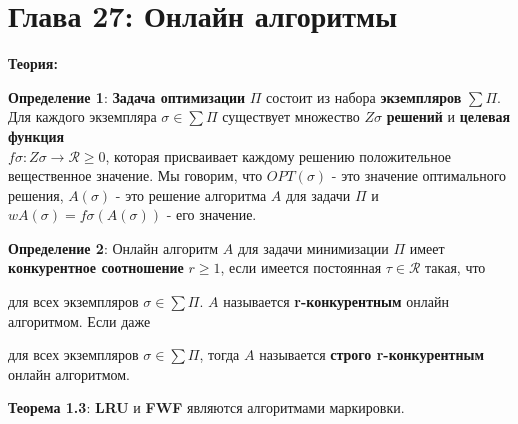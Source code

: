 
\chapter*{Глава 27: Онлайн алгоритмы}

\textbf{Теория:}

\vspace{\baselineskip}

\textbf{Определение 1}: \textbf{Задача оптимизации} $\Pi$ состоит из набора \textbf{экземпляров} $\sum \Pi$. Для каждого экземпляра $\sigma \in \sum\Pi$ существует множество $Z\sigma$ \textbf{решений} и \textbf{целевая функция} \\ $f\sigma:Z\sigma\rightarrow\mathcal{R}\geq0$, которая присваивает каждому решению положительное вещественное значение. Мы говорим, что $OPT(\sigma)$ - это значение оптимального решения, $A(\sigma)$ - это решение алгоритма $A$ для задачи $\Pi$ и $wA(\sigma)=f\sigma(A(\sigma))$ - его значение.

\vspace{\baselineskip}

\textbf{Определение 2}: Онлайн алгоритм $A$ для задачи минимизации $\Pi$ имеет \textbf{конкурентное соотношение} $r \geq 1$, если имеется постоянная $\tau\in\mathcal{R}$ такая, что

\vspace{\baselineskip}


\vspace{\baselineskip}

для всех экземпляров $\sigma\in\sum\Pi$. $A$ называется \textbf{r-конкурентным} онлайн алгоритмом. Если даже

\vspace{\baselineskip}


\vspace{\baselineskip}

для всех экземпляров $\sigma\in\sum\Pi$, тогда $A$ называется \textbf{строго r-конкурентным} онлайн алгоритмом.

\vspace{\baselineskip}

\textbf{Теорема 1.3}: \textbf{LRU} и \textbf{FWF} являются алгоритмами маркировки.

\vspace{\baselineskip}

